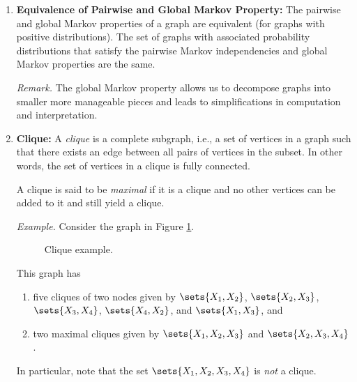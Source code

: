 \documentclass[12pt]{article}
\begin{document}
\begin{enumerate}[label=\textbf{\arabic*.}]
	\item \textbf{Equivalence of Pairwise and Global Markov Property:} The pairwise and global Markov properties of a graph are equivalent (for graphs with positive distributions). The set of graphs with associated probability distributions that satisfy the pairwise Markov independencies and global Markov properties are the same. 
	
	\textit{Remark.} The global Markov property allows us to decompose graphs into smaller more manageable pieces and leads to simplifications in computation and interpretation. 
	
	\item \textbf{Clique:} A \textit{clique} is a complete subgraph, i.e., a set of vertices in a graph such that there exists an edge between all pairs of vertices in the subset. In other words, the set of vertices in a clique is fully connected. 
	
	A clique is said to be \textit{maximal} if it is a clique and no other vertices can be added to it and still yield a clique. 
	
	\textit{Example.} Consider the graph in Figure \ref{fig-clique-example}. 
	\begin{figure}[h]
		\centering
		\captionsetup{width=.7\linewidth}
		\caption{Clique example.}
		\label{fig-clique-example}
	\end{figure}
	
	This graph has 
	\begin{enumerate}
		\item five cliques of two nodes given by $\sets{X_1, X_2}$, $\sets{X_2, X_3}$, $\sets{X_3, X_4}$, $\sets{X_4, X_2}$, and $\sets{X_1, X_3}$, and 
		\item two maximal cliques given by $\sets{X_1, X_2, X_3}$ and $\sets{X_2, X_3, X_4}$. 
	\end{enumerate}
	In particular, note that the set $\sets{X_1, X_2, X_3, X_4}$ is \emph{not} a clique. 
	

\end{enumerate}
\end{document}
